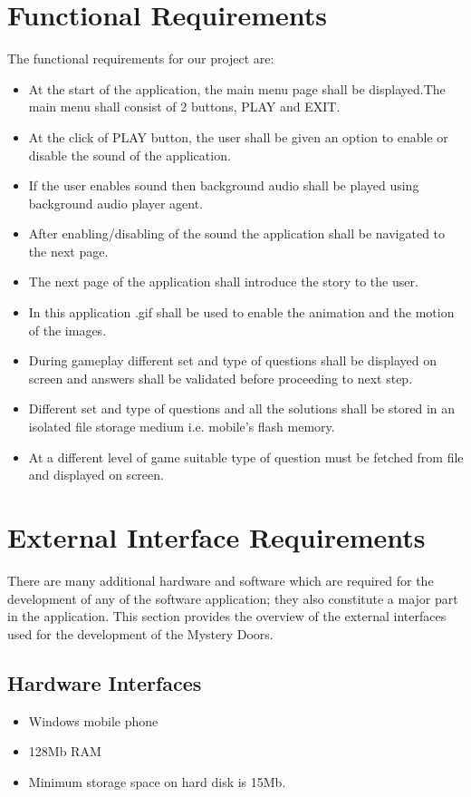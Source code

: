 \section{Functional Requirements}
The functional requirements for our project are:
\hspace{1cm}
\begin{itemize}
\item \textbf {}At the start of the application, the main menu page shall be displayed.The main menu shall consist of 2 buttons, PLAY and EXIT.
\item \textbf {}At the click of PLAY button, the user shall be given an option to enable or disable the sound of the application.
\item \textbf {}If the user enables sound then background audio shall be played using background audio player agent. 
\item \textbf {}After enabling/disabling of the sound the application shall be navigated to the next page.
\item \textbf {}The next page of the application shall introduce the story to the user.
\item \textbf {}In this application .gif shall be used to enable the animation and the motion of the images. 
\item \textbf {}During gameplay different set and type of questions shall be displayed on screen and answers shall be validated before proceeding to next step.
\item \textbf {}Different set and type of questions and all the solutions shall be stored in an isolated file storage medium i.e. mobile’s flash memory. 
\item \textbf {}At a different level of game suitable type of question must be fetched from file and displayed on screen.
\end{itemize}

\section{External Interface Requirements}
\hspace{1cm}There are many additional hardware and software which are required
for the development of any of the software application; they also constitute
a major part in the application. This section provides the overview of the
external interfaces used for the development of the Mystery Doors.



\subsection{Hardware Interfaces}
\begin{itemize}
\item \textbf {}Windows mobile phone 
\item \textbf {}128Mb RAM
\item \textbf {}Minimum storage space on hard disk is 15Mb. 
\end{itemize}

